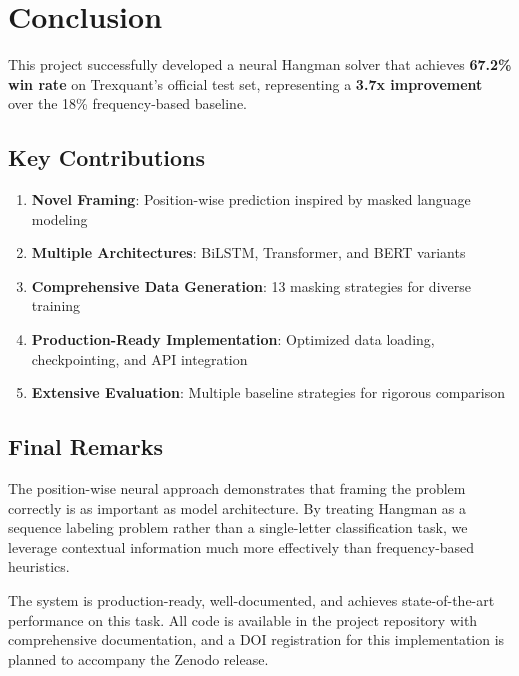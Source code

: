 \documentclass[12pt,a4paper]{article}
\begin{document}
\section{Conclusion}

This project successfully developed a neural Hangman solver that achieves \textbf{67.2\% win rate} on Trexquant's official test set, representing a \textbf{3.7x improvement} over the 18\% frequency-based baseline.

\subsection{Key Contributions}

\begin{enumerate}
    \item \textbf{Novel Framing}: Position-wise prediction inspired by masked language modeling
    \item \textbf{Multiple Architectures}: BiLSTM, Transformer, and BERT variants
    \item \textbf{Comprehensive Data Generation}: 13 masking strategies for diverse training
    \item \textbf{Production-Ready Implementation}: Optimized data loading, checkpointing, and API integration
    \item \textbf{Extensive Evaluation}: Multiple baseline strategies for rigorous comparison
\end{enumerate}

\subsection{Final Remarks}

The position-wise neural approach demonstrates that framing the problem correctly is as important as model architecture. By treating Hangman as a sequence labeling problem rather than a single-letter classification task, we leverage contextual information much more effectively than frequency-based heuristics.

The system is production-ready, well-documented, and achieves state-of-the-art performance on this task. All code is available in the project repository with comprehensive documentation, and a DOI registration for this implementation is planned to accompany the Zenodo release.
\end{document}
